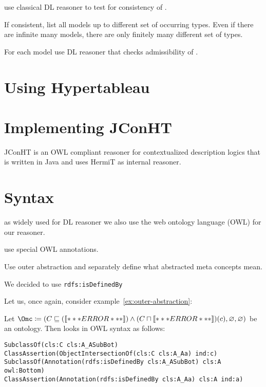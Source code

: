 use classical DL reasoner to test for consistency of \Bmfb.

If consistent, list all models up to different set of occurring types. Even if there are infinite
many models, there are only finitely many different set of types.

For each model use DL reasoner that checks admissibility of \Zmc.

\section{Using Hypertableau}
\label{sec:using-hypertableau}




\section{Implementing JConHT}
\label{sec:implementing-jconht}

JConHT is an OWL compliant reasoner for contextualized description logics that is written in Java
and uses HermiT as internal reasoner.


\section{Syntax}
\label{sec:syntax}


as widely used for DL reasoner we also use the web ontology language (OWL) for our reasoner. 

use special OWL annotations.

Use outer abstraction and separately define what abstracted meta concepts mean.


We decided to use \verb+rdfs:isDefinedBy+

Let us, once again, consider example~\ref{ex:outer-abstraction}:
\begin{example}\label{ex:outer-abstraction-as-OWL}
  Let
  $\Omc \coloneqq (C\sqsubseteq(\oax{A\sqsubseteq\bot}) \land (C\sqcap\oax{A(a)})(c), \emptyset,
  \emptyset)$ be an \ALCALC ontology. Then \Omc looks in OWL syntax as follows:

\begin{verbatim}
SubclassOf(cls:C cls:A_ASubBot)
ClassAssertion(ObjectIntersectionOf(cls:C cls:A_Aa) ind:c)
SubclassOf(Annotation(rdfs:isDefinedBy cls:A_ASubBot) cls:A owl:Bottom)
ClassAssertion(Annotation(rdfs:isDefinedBy cls:A_Aa) cls:A ind:a)
\end{verbatim}

\vspace{-2.0\baselineskip}  
\end{example}


